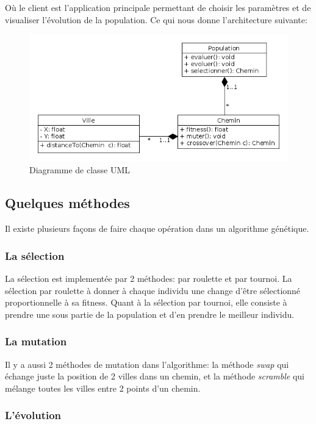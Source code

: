 \documentclass[11pt]{article}
\begin{document}
Où le client est l'application principale permettant de choisir les paramètres et de visualiser l'évolution de la population.
Ce qui nous donne l'architecture suivante:

\begin{figure}[h]
\centering
\includegraphics[width=.9\linewidth]{./UML_Class.png}
\caption{Diagramme de classe UML}
\end{figure}

\subsection{Quelques méthodes}
\label{sec-2-2}

Il existe plusieurs façons de faire chaque opération dans un algorithme génétique.

\subsubsection{La sélection}

La sélection est implementée par 2 méthodes: par roulette et par tournoi. La sélection par
roulette à donner à chaque individu une change d'être sélectionné proportionnelle à sa
fitness. Quant à la sélection par tournoi, elle consiste à prendre une sous partie
de la population et d'en prendre le meilleur individu.

\subsubsection{La mutation}

Il y a aussi 2 méthodes de mutation dans l'algorithme: la méthode \emph{swap} qui échange juste
la position de 2 villes dans un chemin, et la méthode \emph{scramble} qui mélange toutes les villes
entre 2 points d'un chemin.

\subsubsection{L'évolution}
\end{document}
